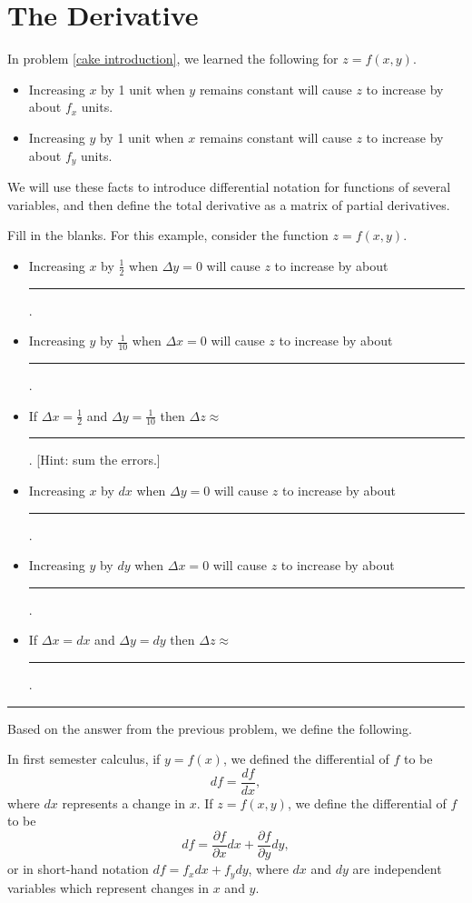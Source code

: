 \section{The Derivative}
\begin{remark}
 In problem \ref{cake introduction}, we learned the following for  $z=f(x,y)$.
\begin{itemize}
 \item Increasing $x$ by 1 unit when $y$ remains constant will cause $z$ to increase by about $f_x$ units.
 \item Increasing $y$ by 1 unit when $x$ remains constant will cause $z$ to increase by about $f_y$ units.
\end{itemize}
We will use these facts to introduce differential notation for functions of several variables, and then define the total derivative as a matrix of partial derivatives.
\end{remark}

\begin{problem}
 Fill in the blanks. For this example, consider the function $z=f(x,y)$.
\begin{itemize}
 \item Increasing $x$ by $\frac{1}{2}$ when $\Delta y=0$ will cause $z$ to increase by about \rule{1cm}{1pt}.
 \item Increasing $y$ by $\frac{1}{10}$ when $\Delta x=0$ will cause $z$ to increase by about \rule{1cm}{1pt}.
 \item If $\Delta x=\frac{1}{2}$ and $\Delta y=\frac{1}{10}$ then $\Delta z\approx$ \rule{2cm}{1pt}. [Hint: sum the errors.]
 \item Increasing $x$ by $dx$ when $\Delta y=0$ will cause $z$ to increase by about \rule{1cm}{1pt}.
 \item Increasing $y$ by $dy$ when $\Delta x=0$ will cause $z$ to increase by about \rule{1cm}{1pt}.
 \item If $\Delta x=dx$ and $\Delta y=dy$ then $\Delta z\approx$ \rule{2cm}{1pt}.
\end{itemize}
\hrule\end{problem}

Based on the answer from the previous problem, we define the following.
\begin{definition}
In first semester calculus, if $y=f(x)$, we defined the differential of $f$ to be
$$df = \frac{df}{dx},$$ where $dx$ represents a change in $x$.
If $z=f(x,y)$, we define the differential of $f$ to be 
$$df= \frac{\partial f}{\partial x}dx+ \frac{\partial f}{\partial y}dy,$$
or in short-hand notation $df=f_xdx+f_ydy$, 
where $dx$ and $dy$ are independent variables which represent changes in $x$ and $y$.
\end{definition}

